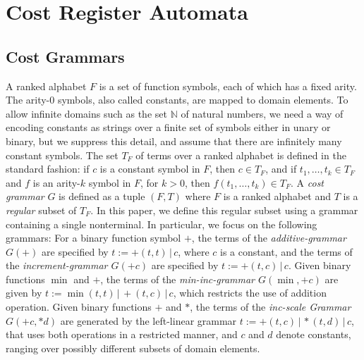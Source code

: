 \documentclass[11pt]{article}
\newcommand{\mypar}[1]{\subsection{#1}}
\newcommand{\Nat}{\ensuremath{\mathbb{N}}}
\newcommand{\vocab}{F}
\newcommand{\trees}{T}
\newcommand{\CG}{G}
\newcommand{\sep}{\ensuremath{\,|\,}}
\newcommand{\treesof}[1]{T_{#1}}
\begin{document}
\section{Cost Register Automata}\label{sec:cra}
\mypar{Cost Grammars}
A ranked alphabet $\vocab$ is a set of function symbols, each of which
has a fixed arity.  The arity-0 symbols, also called constants, are
mapped to domain elements.  To allow infinite domains such as the set
$\Nat$ of natural numbers, we need a way of encoding constants as
strings over a finite set of symbols either in unary or binary, but we
suppress this detail, and assume that there are infinitely many
constant symbols.  The set $\treesof{\vocab}$ of terms over a ranked
alphabet is defined in the standard fashion: if $c$ is a constant
symbol in $\vocab$, then $c \in \treesof{\vocab}$, and if
$t_1,\ldots,t_k \in \treesof{\vocab}$ and $f $ is an arity-$k$ symbol
in $\vocab$, for $k>0$, then $f(t_1,\ldots,t_k) \in \treesof{\vocab}$.
A {\em cost grammar} $\CG$ is defined as a tuple $(\vocab, \trees)$
where $\vocab$ is a ranked alphabet and $\trees$ is a {\em regular}
subset of $\treesof{\vocab}$. In this paper, we define this regular
subset using a grammar containing a single nonterminal.  In
particular, we focus on the following grammars: For a binary function
symbol $+$, the terms of the {\it additive-grammar $\CG(+)$} are
specified by $t := +(t,t) \sep c$, where $c$ is a constant, and the
terms of the {\it increment-grammar $\CG(+c)$} are specified by $t :=
+(t,c) \sep c$.  Given binary functions $\min$ and $+$, the terms of
the {\em min-inc-grammar $\CG(\min,+c)$\/} are given by $t :=
\min(t,t) \sep +(t,c) \sep c$, which restricts the use of addition
operation.  Given binary functions $+$ and $*$, the terms of the {\it
inc-scale Grammar $\CG(+c,*d)$} are generated by the left-linear
grammar $t := +(t,c) \sep *(t,d) \sep c$, that uses both operations in
a restricted manner, and $c$ and $d$ denote constants, ranging over
possibly different subsets of domain elements.
\end{document}
